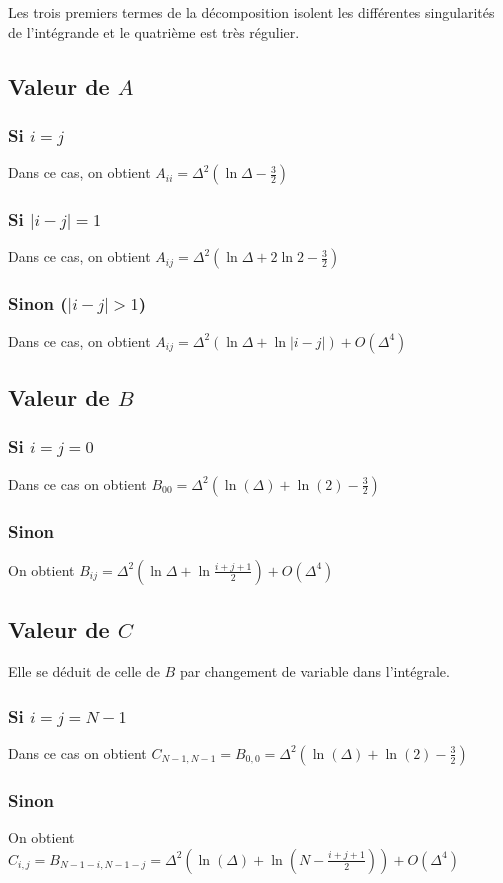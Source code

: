 \documentclass[11pt,a4paper]{article}
\begin{document}
	Les trois premiers termes de la décomposition isolent les différentes singularités de l'intégrande et le quatrième est très régulier. 
	
	\subsection*{Valeur de $A$}
	\subsubsection*{Si $i=j$}
	Dans ce cas, on obtient $A_{ii} = \Delta^2(\ln\Delta - \frac{3}{2})$
	\subsubsection*{Si $|i-j| = 1$}
	Dans ce cas, on obtient $A_{ij} = \Delta^2(\ln\Delta + 2\ln2 - \frac{3}{2})$
	\subsubsection*{Sinon ($|i-j| > 1$)}
	Dans ce cas, on obtient $A_{ij} = \Delta^2(\ln\Delta + \ln|i-j|) + O(\Delta^4)$
	\subsection*{Valeur de $B$}
	\subsubsection*{Si $i = j = 0$}
	Dans ce cas on obtient $B_{00} = \Delta^2(\ln(\Delta) + \ln(2) - \frac{3}{2})$
	\subsubsection*{Sinon}
	On obtient $B_{ij} = \Delta^2(\ln\Delta + \ln\frac{i+j+1}{2}) + O(\Delta^4)$
	\subsection*{Valeur de $C$}
	Elle se déduit de celle de $B$ par changement de variable dans l'intégrale.
	\subsubsection*{Si $i = j = N-1$}
	Dans ce cas on obtient $C_{N-1,N-1} = B_{0,0} = \Delta^2(\ln(\Delta) + \ln(2) - \frac{3}{2})$
	\subsubsection*{Sinon}
	On obtient $C_{i,j} = B_{N-1-i,N-1-j} = \Delta^2\left(\ln(\Delta) + \ln\left(N-\frac{i+j+1}{2}\right)\right) + O(\Delta^4)$
	
\end{document}
